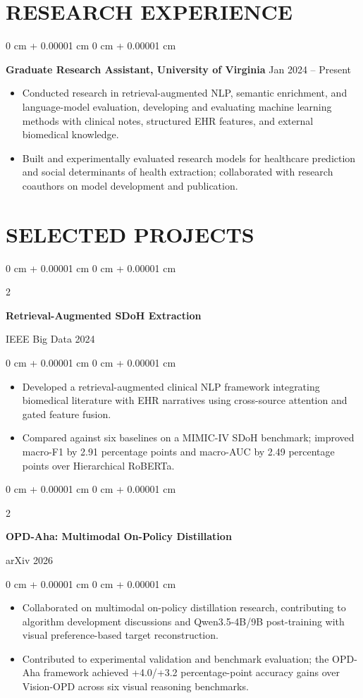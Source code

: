 \documentclass[10pt, letterpaper]{article}
\newenvironment{highlights}{
    \begin{itemize}[
        topsep=0.03 cm,
        parsep=0.03 cm,
        partopsep=0pt,
        itemsep=0pt,
        leftmargin=0 cm + 10pt
    ]
}{
    \end{itemize}
} %
\newenvironment{onecolentry}{
    \begin{adjustwidth}{
        0 cm + 0.00001 cm
    }{
        0 cm + 0.00001 cm
    }
}{
    \end{adjustwidth}
} %
\newenvironment{twocolentry}[2][]{
    \onecolentry
    \def\secondColumn{#2}
    \setcolumnwidth{\fill, 4.5 cm}
    \begin{paracol}{2}
}{
    \switchcolumn \raggedleft \secondColumn
    \end{paracol}
    \endonecolentry
} %
\begin{document}
\section{RESEARCH EXPERIENCE}
\begin{onecolentry}
\textbf{Graduate Research Assistant, University of Virginia} \hfill Jan 2024 -- Present
\begin{highlights}
\item Conducted research in retrieval-augmented NLP, semantic enrichment, and language-model evaluation, developing and evaluating machine learning methods with clinical notes, structured EHR features, and external biomedical knowledge.
\item Built and experimentally evaluated research models for healthcare prediction and social determinants of health extraction; collaborated with research coauthors on model development and publication.
\end{highlights}
\end{onecolentry}
\section{SELECTED PROJECTS}

\begin{twocolentry}{IEEE Big Data 2024}
\textbf{Retrieval-Augmented SDoH Extraction}
\end{twocolentry}
\begin{onecolentry}
\begin{highlights}
\item Developed a retrieval-augmented clinical NLP framework integrating biomedical literature with EHR narratives using cross-source attention and gated feature fusion.
\item Compared against six baselines on a MIMIC-IV SDoH benchmark; improved macro-F1 by 2.91 percentage points and macro-AUC by 2.49 percentage points over Hierarchical RoBERTa.
\end{highlights}
\end{onecolentry}
\vspace{0.06 cm}

\begin{twocolentry}{arXiv 2026}
\textbf{OPD-Aha: Multimodal On-Policy Distillation}
\end{twocolentry}
\begin{onecolentry}
\begin{highlights}
\item Collaborated on multimodal on-policy distillation research, contributing to algorithm development discussions and Qwen3.5-4B/9B post-training with visual preference-based target reconstruction.
\item Contributed to experimental validation and benchmark evaluation; the OPD-Aha framework achieved +4.0/+3.2 percentage-point accuracy gains over Vision-OPD across six visual reasoning benchmarks.
\end{highlights}
\end{onecolentry}
\vspace{0.06 cm}
\end{document}

